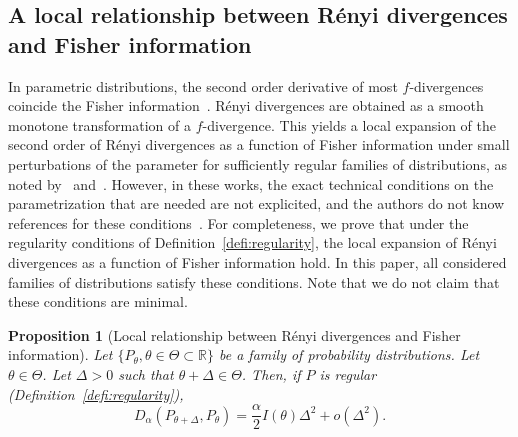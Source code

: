 \documentclass{article}
\theoremstyle{plain}
\newtheorem{proposition}{Proposition}[section]
\theoremstyle{definition}
\theoremstyle{remark}
\begin{document}
\subsection{A local relationship between Rényi divergences and Fisher information}
\label{app:Local-fisher-renyi}
In parametric distributions, the second order derivative of most $f$-divergences coincide the Fisher information~\citep{Polyanskiy2025}. Rényi divergences are obtained as a smooth monotone transformation of a $f$-divergence. This yields a local expansion of the second order of Rényi divergences as a function of Fisher information under small perturbations of the parameter for sufficiently regular families of distributions, as noted by~\citet{Haussler1997} and~\citet{vanErven2014}. However, in these works, the exact technical conditions on the parametrization that are needed are not explicited, and the authors do not know references for these conditions~\citep{vanErven2014}. For completeness, we prove that under the regularity conditions of Definition~\ref{defi:regularity}, the local expansion of Rényi divergences as a function of Fisher information hold. In this paper, all considered families of distributions satisfy these conditions. Note that we do not claim that these conditions are minimal.

\begin{proposition}[Local relationship between Rényi divergences and Fisher information]
\label{prop:local-fisher-app}
    Let $\{P_\theta, \theta\in \Theta \subset \mathbb{R}\}$ be a family of probability distributions. 
    Let $\theta \in \Theta$. Let $\Delta > 0$ such that $\theta + \Delta \in \Theta$. Then, if $P$ is regular (Definition~\ref{defi:regularity}),
    \[D_\alpha(P_{\theta + \Delta},P_{\theta}) = \frac{\alpha}{2}I(\theta)\Delta^2 + o(\Delta^2).\]
\end{proposition}
\end{document}
